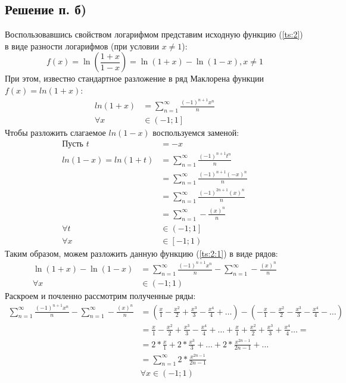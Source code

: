 \documentclass[12pt, a4paper]{article}
\begin{document}
\subsection{Решение п. б)}
Воспользовавшись свойством логарифмом представим исходную функцию (\ref{ts:2}) в виде разности логарифмов (при условии $x \neq 1$):
\begin{equation} \label{ts:2:1}
f(x)=\ln\left(\frac{1+x}{1-x}\right) = \ln\left(1+x\right) - \ln\left(1-x\right), x \neq 1
\end{equation}
При этом, известно стандартное разложение в ряд Маклорена функции $f(x)=ln\left(1+x\right)$:
\begin{equation*}
\begin{aligned}
ln\left(1+x\right) &= \sum_{n=1}^{\infty}\frac{(-1)^{n+1}x^n}{n}\\
\forall x &\in \left(-1; 1\right]
\end{aligned}
\end{equation*}
Чтобы разложить слагаемое $ln\left(1-x\right)$ воспользуемся заменой:
\begin{equation*}
\begin{aligned}
\text{Пусть } t &= -x\\
ln(1-x) = ln(1+t) &= \sum_{n=1}^{\infty}\frac{(-1)^{n+1}t^n}{n}\\
& = \sum_{n=1}^{\infty}\frac{(-1)^{n+1}(-x)^n}{n}\\
& = \sum_{n=1}^{\infty}\frac{(-1)^{2n+1}(x)^n}{n}\\
& = \sum_{n=1}^{\infty}-\frac{(x)^n}{n}\\
\forall t &\in \left(-1; 1\right]\\
\forall x &\in \left[-1; 1\right)
\end{aligned}
\end{equation*}
Таким образом, можем разложить данную функцию (\ref{ts:2:1}) в виде рядов:
\begin{equation*}
\begin{aligned}
\ln\left(1+x\right) - \ln\left(1-x\right) &=  \sum_{n=1}^{\infty}\frac{(-1)^{n+1}x^n}{n} - \sum_{n=1}^{\infty}-\frac{(x)^n}{n}\\
\forall x &\in \left(-1; 1\right)
\end{aligned}
\end{equation*}
Раскроем и почленно рассмотрим полученные ряды:
\begin{equation*}
\begin{aligned}
\sum_{n=1}^{\infty}\frac{(-1)^{n+1}x^n}{n} - \sum_{n=1}^{\infty}-\frac{(x)^n}{n} &= \left(\frac{x}{1} - \frac{x^2}{2} + \frac{x^3}{3} - \frac{x^4}{4} + \ldots\right) - \left(-\frac{x}{1}-\frac{x^2}{2}-\frac{x^3}{3}- \frac{x^4}{4} -\ldots \right)\\
&= \frac{x}{1} - \frac{x^2}{2} + \frac{x^3}{3} - \frac{x^4}{4} + \ldots + \frac{x}{1} + \frac{x^2}{2} + \frac{x^3}{3} + \frac{x^4}{4} \ldots = \\
&= 2 * \frac{x}{1} + 2 * \frac{x^3}{3} + \ldots + 2 * \frac{x^{2n-1}}{2n-1} + \ldots\\
&= \sum_{n=1}^\infty 2 * \frac{x^{2n-1}}{2n-1}\\
&\forall x \in \left(-1; 1\right)
\end{aligned}
\end{equation*}
\end{document}
